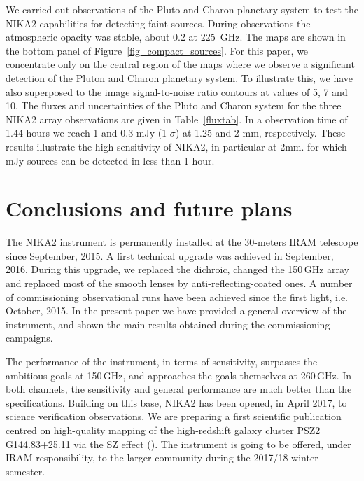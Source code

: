 \documentclass[]{aa} %
\begin{document}
We carried out observations of the Pluto and Charon planetary system to test the NIKA2 capabilities for detecting faint sources. 
During observations the atmospheric opacity was stable, about 0.2 at 225~GHz.
The maps are shown in the bottom panel of Figure~\ref{fig_compact_sources}. For this paper, we concentrate only on the central region of the maps where we observe a significant detection of the Pluton and Charon planetary system. To illustrate this, we have also superposed to the image signal-to-noise ratio contours at values of 5, 7 and 10. The fluxes and uncertainties of the Pluto and Charon system for the three NIKA2 array observations are given in Table~\ref{fluxtab}. In a observation time of 1.44 hours we reach 1 and 0.3 mJy (1-$\sigma$) at 1.25 and 2 mm, respectively.
These results illustrate the high sensitivity of NIKA2, in particular at 2mm. for which mJy sources can be detected in less than 1 hour.



%
%





\section{Conclusions and future plans}

The NIKA2 instrument is permanently installed at the 30-meters IRAM telescope since September, 2015. A first technical upgrade was achieved in September, 2016. During this upgrade, we replaced the dichroic, changed the 150\,GHz array and replaced most of the smooth lenses by anti-reflecting-coated ones. A number of commissioning observational runs have been achieved since the first light, i.e. October, 2015. In the present paper we have provided a general overview of the instrument, and shown the main results obtained during the commissioning campaigns. 

The performance of the instrument, in terms of sensitivity, surpasses the ambitious goals at 150\,GHz, and approaches the goals themselves at 260\,GHz. In both channels, the sensitivity and general performance are much better than the specifications. 
Building on this base, NIKA2 has been opened, in April 2017, to science verification observations. We are preparing a first scientific publication centred on high-quality mapping of the high-redshift galaxy cluster PSZ2 G144.83+25.11 via the SZ effect (\cite{Ruppin2017}). The instrument is going to be offered, under IRAM responsibility, to the larger community during the 2017/18 winter semester. 
\end{document}
